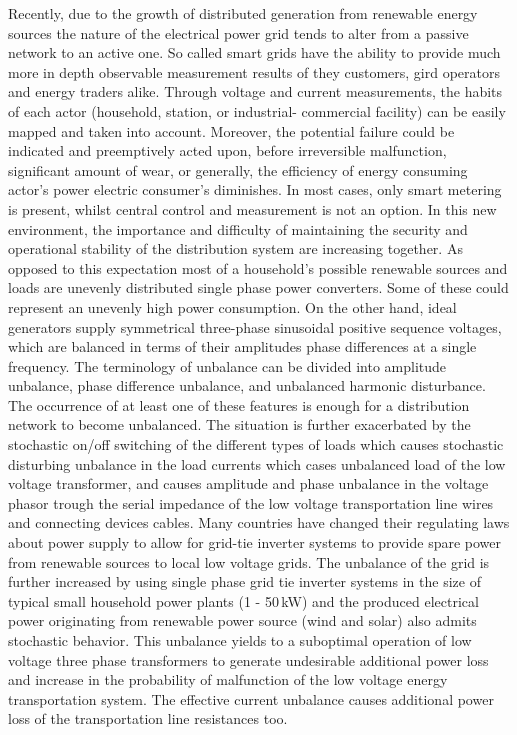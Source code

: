 
Recently, due to the growth of distributed generation from renewable energy sources the nature of the electrical power grid tends to alter from a passive network to an active one. So called smart grids have the ability to provide much more in depth observable measurement results of they customers, gird operators and energy traders alike. Through voltage and current measurements, the habits of each actor (household, station, or industrial- commercial facility) can be easily mapped and taken into account. Moreover, the potential failure could be indicated and preemptively acted upon, before irreversible malfunction, significant amount of wear, or generally, the efficiency of energy consuming actor's power electric consumer's diminishes. In most cases, only smart metering is present, whilst central control and measurement is not an option.
 In this new environment, the importance and difficulty of maintaining the security and operational stability of the distribution system are increasing together. As opposed to this expectation most of a household's possible renewable sources and loads are unevenly distributed single phase power converters. Some of these could represent an unevenly high power consumption. 
On the other hand, ideal generators supply symmetrical three-phase sinusoidal positive sequence voltages, which are balanced in terms of their amplitudes phase differences at a single frequency. The terminology of unbalance can be divided into amplitude unbalance, phase difference unbalance, and unbalanced harmonic disturbance. The occurrence of at least one of these features is enough for a distribution network to become unbalanced. 
The situation is further exacerbated by the stochastic on/off switching of the different types of loads which causes stochastic disturbing unbalance in the load currents which cases unbalanced load of the low voltage transformer, and causes amplitude and phase unbalance in the voltage phasor trough the serial impedance of the low voltage transportation line wires and connecting devices cables. Many countries have changed their regulating laws about power supply to allow for grid-tie inverter systems to provide spare power from renewable sources to local low voltage grids. 
The unbalance of the grid is further increased by using single phase grid tie inverter systems in the size of typical small household power plants (1 - 50\,kW) and the produced electrical power originating from renewable power source (wind and solar) also admits stochastic behavior. This unbalance yields to a suboptimal operation of low voltage three phase transformers to generate undesirable additional power loss and increase in the probability of malfunction of the low voltage energy transportation system.  The effective current unbalance causes additional power loss of the transportation line resistances too.

